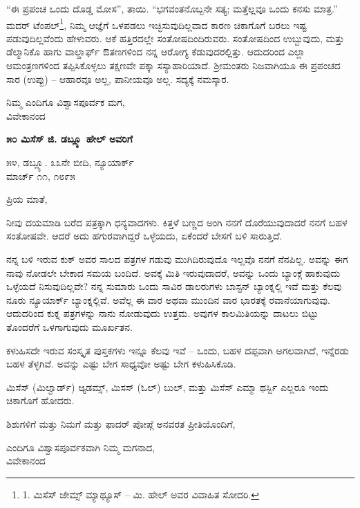 “ಈ ಪ್ರಪಂಚ ಒಂದು ದೊಡ್ಡ ಮೋಸ”, ತಾಯಿ. “ಭಗವಂತನೊಬ್ಬನೇ ಸತ್ಯ; ಮತ್ತೆಲ್ಲವೂ ಒಂದು ಕನಸು ಮಾತ್ರ.” ಮದರ್ ಟೆಂಪಲ್\footnote{1. ಮಿಸೆಸ್ ಜೇಮ್ಸ್ ಮ್ಯಾಥ್ಯೂಸ್ – ಮಿ. ಹೇಲ್ ಅವರ ವಿವಾಹಿತ ಸೋದರಿ.}, ನಿಮ್ಮ ಆಜ್ಞೆಗೆ ಒಳಪಡಲು ಇಚ್ಛಿಸುವುದಿಲ್ಲವಾದ ಕಾರಣ ಚಿಕಾಗೊಗೆ ಬರಲು ಇಷ್ಟ ಪಡುವುದಿಲ್ಲವೆಂದು ಹೇಳುವರು. ಆಕೆ ಹತ್ತಿರದಲ್ಲೇ ಸಂತೋಷದಿಂದಿರುವರು. ಸಂತೋಷದಿಂದ ಉಬ್ಬುವುದು, ಮತ್ತು ಡೆಲ್ಮಾನಿಕೊ ಹಾಗು ವಾಲ್ಡಾರ್ಫ್ ಔತಣಗಳಿಂದ ನನ್ನ ಆರೋಗ್ಯ ಕೆಡುವುದರಲ್ಲಿತ್ತು. ಆದುದರಿಂದ ಎಲ್ಲಾ ಆಮಂತ್ರಣಗಳಿಂದ ತಪ್ಪಿಸಿಕೊಳ್ಳಲು ತಕ್ಷಣವೇ ಪಕ್ಕಾ ಸಸ್ಯಾಹಾರಿಯಾದೆ. ಶ‍್ರೀಮಂತರು ನಿಜವಾಗಿಯೂ ಈ ಪ್ರಪಂಚದ ಸಾರ (ಉಪ್ಪು) – ಆಹಾರವೂ ಅಲ್ಲ, ಪಾನೀಯವೂ ಅಲ್ಲ. ಸದ್ಯಕ್ಕೆ ನಮಸ್ಕಾರ.

\begin{flushright}
ನಿಮ್ಮ ಎಂದಿಗೂ ವಿಶ್ವಾಸಪೂರ್ವಕ ಮಗ,\\ವಿವೇಕಾನಂದ
\end{flushright}

\begin{center}
\textbf{೫೦ ಮಿಸೆಸ್ ಜಿ. ಡಬ್ಲ್ಯೂ ಹೇಲ್ ಅವರಿಗೆ}
\end{center}

\begin{flushright}
೫೪, ಡಬ್ಲ್ಯೂ. ೩೩ನೇ ಬೀದಿ, ನ್ಯೂಯಾರ್ಕ್\\ಮಾರ್ಚ್ ೧೧, ೧೮೯೫
\end{flushright}

ಪ್ರಿಯ ಮಾತೆ,

ನೀವು ದಯಮಾಡಿ ಬರೆದ ಪತ್ರಕ್ಕಾಗಿ ಧನ್ಯವಾದಗಳು. ಕಿತ್ತಳೆ ಬಣ್ಣದ ಅಂಗಿ ನನಗೆ ದೊರೆಯುವುದಾದರೆ ನನಗೆ ಬಹಳ ಸಂತೋಷವೇ. ಆದರೆ ಅದು ಹಗುರವಾಗಿದ್ದರೆ ಒಳ್ಳೆಯದು, ಏಕೆಂದರೆ ಬೇಸಗೆ ಬಳಿ ಸಾರುತ್ತಿದೆ.

ನನ್ನ ಬಳಿ ಇರುವ ಕುಕ್ ಅವರ ಸಾಲದ ಪತ್ರಗಳ ಗಡುವು ಮುಗಿದಿರುವುದೊ ಇಲ್ಲವೊ ನನಗೆ ನೆನಪಿಲ್ಲ. ಅವನ್ನು ಈಗ ನಾವು ನೋಡಲೇ ಬೇಕಾದ ಸಮಯ ಬಂದಿದೆ. ಅವಕ್ಕೆ ಮಿತಿ ಇರುವುದಾದರೆ, ಅವನ್ನು ಒಂದು ಬ್ಯಾಂಕ್ಗೆ ಹಾಕುವುದು ಒಳ್ಳೆಯದೆ ನಿಸುವುದಿಲ್ಲವೇ? ನನ್ನ ಸುಮಾರು ಒಂದು ಸಾವಿರ ಡಾಲರುಗಳು ಬಾಸ್ಟನ್ ಬ್ಯಾಂಕ್ನಲ್ಲಿ ಇವೆ ಮತ್ತು ಕೆಲವು ನೂರು ನ್ಯೂಯಾರ್ಕ್ ಬ್ಯಾಂಕ್ನಲ್ಲಿವೆ. ಅವೆಲ್ಲ ಈ ವಾರ ಅಥವಾ ಮುಂದಿನ ವಾರ ಭಾರತಕ್ಕೆ ರವಾನೆಯಾಗುವುವು. ಆದುದರಿಂದ ಕುಕ್ನ ಪತ್ರಗಳನ್ನು ನಾನು ನೋಡುವುದು ಉತ್ತಮ. ಅವುಗಳ ಕಾಲಮಿತಿಯನ್ನು ದಾಟಲು ಬಿಟ್ಟು ತೊಂದರೆಗೆ ಒಳಗಾಗುವುದು ಮೂರ್ಖತನ.

ಕಳುಹಿಸದೇ ಇರುವ ಸಂಸ್ಕೃತ ಪುಸ್ತಕಗಳು ಇನ್ನೂ ಕೆಲವು ಇವೆ – ಒಂದು, ಬಹಳ ದಪ್ಪವಾಗಿ ಅಗಲವಾಗಿದೆ, ಇನ್ನೆರಡು ಬಹಳ ತೆಳ್ಳಗಿವೆ. ಅವನ್ನು ಎಷ್ಟು ಬೇಗ ಸಾಧ್ಯವೋ ಅಷ್ಟು ಬೇಗ ಕಳುಹಿಸಿಕೊಡಿ.

ಮಿಸೆಸ್ (ಮಿಲ್ವಾರ್ಡ್) ಆ್ಯಡಮ್ಸ್, ಮಿಸಸ್ (ಓಲ್) ಬುಲ್, ಮತ್ತು ಮಿಸೆಸ್ ಎಮ್ಮಾ ಥರ್ಸ್ಬಿ ಎಲ್ಲರೂ ಇಂದು ಚಿಕಾಗೊಗೆ ಹೋದರು.

ಶಿಶುಗಳಿಗೆ ಮತ್ತು ನಿಮಗೆ ಮತ್ತು ಫಾದರ್ ಪೋಪ್ಗೆ ಅನವರತ ಪ್ರೀತಿಯೊಂದಿಗೆ,

\begin{flushright}
ಎಂದಿಗೂ ವಿಶ್ವಾಸಪೂರ್ವಕವಾಗಿ ನಿಮ್ಮ ಮಗನಾದ,\\ವಿವೇಕಾನಂದ
\end{flushright}

